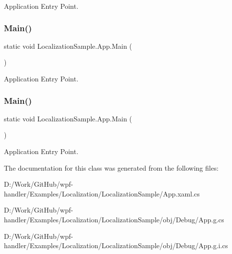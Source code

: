 Application Entry Point. 

\mbox{\label{class_localization_sample_1_1_app_a5cef3512dd87f0925a087abc35c5bb8b}} 
\subsubsection{\texorpdfstring{Main()}{Main()}\hspace{0.1cm}{\footnotesize\ttfamily [3/4]}}
{\footnotesize\ttfamily static void Localization\+Sample.\+App.\+Main (\begin{DoxyParamCaption}{ }\end{DoxyParamCaption})\hspace{0.3cm}{\ttfamily [static]}}



Application Entry Point. 

\mbox{\label{class_localization_sample_1_1_app_a5cef3512dd87f0925a087abc35c5bb8b}} 
\subsubsection{\texorpdfstring{Main()}{Main()}\hspace{0.1cm}{\footnotesize\ttfamily [4/4]}}
{\footnotesize\ttfamily static void Localization\+Sample.\+App.\+Main (\begin{DoxyParamCaption}{ }\end{DoxyParamCaption})\hspace{0.3cm}{\ttfamily [static]}}



Application Entry Point. 



The documentation for this class was generated from the following files\+:\begin{DoxyCompactItemize}
\item 
D\+:/\+Work/\+Git\+Hub/wpf-\/handler/\+Examples/\+Localization/\+Localization\+Sample/App.\+xaml.\+cs\item 
D\+:/\+Work/\+Git\+Hub/wpf-\/handler/\+Examples/\+Localization/\+Localization\+Sample/obj/\+Debug/App.\+g.\+cs\item 
D\+:/\+Work/\+Git\+Hub/wpf-\/handler/\+Examples/\+Localization/\+Localization\+Sample/obj/\+Debug/App.\+g.\+i.\+cs\end{DoxyCompactItemize}
